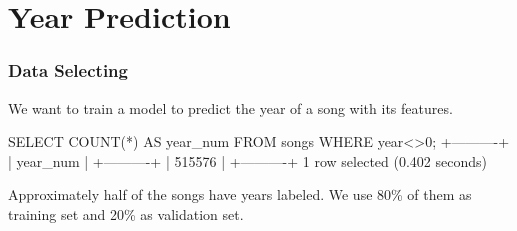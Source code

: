 \documentclass{beamer}
\begin{document}
\section{Year Prediction}


\begin{frame}[fragile]
\frametitle{Data Selecting}
We want to train a model to predict the year of a song with its features.
\begin{mycodesql}
SELECT COUNT(*) AS year_num FROM songs WHERE year<>0;
+----------+
| year_num |
+----------+
| 515576   |
+----------+
1 row selected (0.402 seconds)
\end{mycodesql}
Approximately half of the songs have years labeled. We use 80\% of them as training set and 20\% as validation set.
\end{frame}
\end{document}
